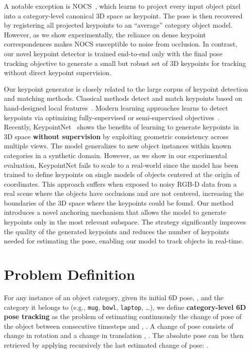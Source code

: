 \documentclass[letterpaper, 10 pt, conference]{ieeeconf}
\begin{document}
A notable exception is NOCS~\cite{wang2019normalized}, which learns to project every input object pixel into a category-level canonical 3D space as keypoint. The pose is then recovered by registering all projected keypoints to an ``average'' category object model. However, as we show experimentally, the reliance on dense keypoint correspondences makes NOCS susceptible to noise from occlusion. In contrast, our novel keypoint detector is trained end-to-end only with the final pose tracking objective to generate a small but robust set of 3D keypoints for tracking without direct keypoint supervision.


Our keypoint generator is closely related to the large corpus of keypoint detection and matching methods. Classical methods detect and match keypoints based on hand-designed local features~\cite{lowe2004distinctive, rublee2011orb, bay2006surf, rosten2006machine, calonder2010brief}. Modern learning approaches learns to detect keypoints via optimizing fully-supervised \cite{huang2017coarse,chen2019adversarial,alp2018densepose} or semi-supervised objectives~\cite{honari2018improving}. Recently, KeypointNet~\cite{suwajanakorn2018discovery} shows the benefits of learning to generate keypoints in 3D space \textbf{without supervision} by exploiting geometric consistency across multiple views. The model generalizes to new object instances within known categories in a synthetic domain. However, as we show in our experimental evaluation, KeypointNet fails to scale to a real-world since the model has been trained to define keypoints on single models of objects centered at the origin of coordinates. This approach suffers when exposed to noisy RGB-D data from a real scene where the objects have occlusions and are not centered, increasing the boundaries of the 3D space where the keypoints could be found. Our method introduces a novel anchoring mechanism that allows the model to generate keypoints only in the most relevant subspace. The strategy significantly improves the quality of the generated keypoints and reduces the number of keypoints needed for estimating the pose, enabling our model to track objects in real-time. 


\section{Problem Definition}
\label{s:back}

For any instance of an object category, given its initial 6D pose, , and the category it belongs to (e.g., \texttt{mug}, \texttt{bowl}, \texttt{laptop}, \ldots), we define \textbf{category-level 6D pose tracking} as the problem of estimating continuously the change of pose of the object between consecutive timesteps  and , . A change of pose consists of change in rotation  and a change in translation , . The absolute pose can be then retrieved by applying recursively the last estimated change of pose: . 
\end{document}
